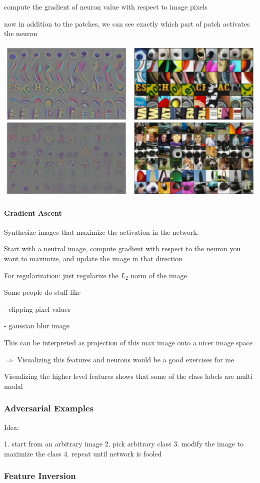 compute the gradient of neuron value with respect to image pixels

now in addition to the patches, we can see exactly which part of patch activates the neuron

\includegraphics[width=0.5\columnwidth]{fei_fei_li/lecture_12/patches.png}

\paragraph{Gradient Ascent}

Synthesize images that maximize the activation in the network.

Start with a neutral image, compute gradient with respect to the neuron you want to maximize, and update the image in that direction

For regularization: just regularize the $L_2$ norm of the image

Some people do stuff like 

- clipping pixel values

- gaussian blur image

This can be interpreted as projection of this max image onto a nicer image space

$\Rightarrow$ Visualizing this features and neurons would be a good exercises for me

Visualizing the higher level features shows that some of the class labels are multi modal

\subsubsection{Adversarial Examples}

Idea: 

1. start from an arbitrary image
2. pick arbitrary class
3. modify the image to maximize the class
4. repeat until network is fooled

\subsubsection{Feature Inversion}

